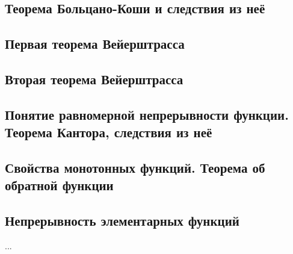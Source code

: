 \subsection{Теорема Больцано-Коши и следствия из неё}

\subsection{Первая теорема Вейерштрасса}

\subsection{Вторая теорема Вейерштрасса}

\subsection{Понятие равномерной непрерывности функции. Теорема Кантора, следствия из неё}


\subsection{Свойства монотонных функций. Теорема об обратной функции}


\subsection{Непрерывность элементарных функций}
...

